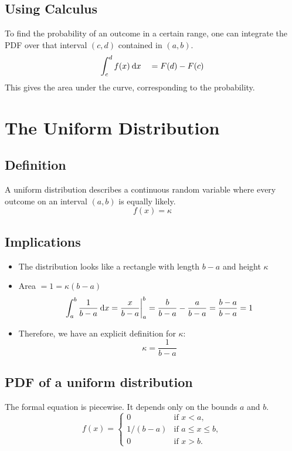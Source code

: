 \documentclass[12pt,letterpaper]{article}
\begin{document}
\subsection{Using Calculus}
To find the probability of an outcome in a certain range,
one can integrate the PDF over that interval
$(c,d)$ contained in $(a,b)$.
\begin{equation*}
\int_c^d f(x) \:\mathrm{d}x \quad = F(d) - F(c)
\end{equation*}
This gives the area under the curve, corresponding to the probability.
\section{The Uniform Distribution}
\subsection{Definition}
A uniform distribution describes a continuous random variable
where every outcome on an interval $(a,b)$ is equally likely.
\begin{equation*}
f(x) = \kappa
\end{equation*}
\subsection{Implications}
\begin{itemize}
\item The distribution looks like a rectangle
with length $b-a$ and height $\kappa$
\item Area $= 1 = \kappa (b-a)$
\begin{equation*}
\int_a^b \frac{1}{b-a} \:\mathrm{d}x = \frac{x}{b-a}\bigg|_a^b
= \frac{b}{b-a} - \frac{a}{b-a} = \frac{b-a}{b-a} = 1
\end{equation*}
\item Therefore, we have an explicit definition for $\kappa$:
\begin{equation*}
\kappa = \frac{1}{b-a}
\end{equation*}
\end{itemize}
\subsection{PDF of a uniform distribution}
The formal equation is piecewise.
It depends only on the bounds $a$ and $b$.
\begin{equation*}
f(x)=
\begin{cases}
0 & \text{if } x < a,\\
1/(b-a) & \text{if } a \leq x \leq b,\\
0 & \text{if } x > b.
\end{cases}
\end{equation*}
\end{document}
